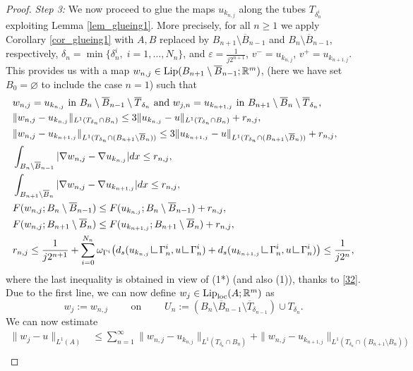\documentclass[a4paper,11pt]{article}
\numberwithin{equation}{section}
\newcommand{\R}{\mathbb{R}}
\newcommand{\res}      {\mathop{\hbox{\vrule height 7pt width .5pt depth
                        0pt\vrule height .5pt width 6pt depth 0pt}}\nolimits}
\begin{document}
\begin{proof}
\textit{Step 3:} We now proceed to glue the maps $u_{k_{n,j}}$ along the tubes $T_{\delta_n^i}$ exploiting Lemma \ref{lem_glueing1}.
More precisely, for all $n\geq1$ we apply Corollary \ref{cor_glueing1} with $A,B$ replaced by $B_{n+1}\setminus \overline B_{n-1}$ and $B_{n}\setminus\overline  B_{n-1} $, respectively, $\delta_n=\min\{\delta_n^i,\;{i=1,\dots,N_n}\}$, and $\varepsilon=\frac{1}{j2^{n+1}}$, $v^-=u_{k_{n,j}}$, $v^+=u_{k_{n+1,j}}$. This provides us with a map $w_{n,j}\in \text{{\rm Lip}}(B_{n+1}\setminus \overline B_{n-1};\R^m)$, (here we have set $B_0=\varnothing$ to include the case $n=1$) such that 
	\begin{align}
	&w_{n,j}=u_{k_{n,j}}\text{ in }B_{n}\setminus\overline  B_{n-1} \setminus \overline T_{\delta_n}\text{ and }w_{j,n}=u_{k_{n+1,j}}\text{ in }B_{n+1}\setminus\overline  B_{n} \setminus  \overline T_{\delta_n},\nonumber\\
	&\|w_{n,j}-u_{k_{n,j}}\|_{L^1(T_{\delta_n}\cap B_n)}\leq 3\|u_{k_{n,j}}-u\|_{L^1(T_{\delta_n}\cap B_n)}+r_{n,j},\nonumber\\
	&\|w_{n,j}-u_{k_{n+1,j}}\|_{L^1(T_{\delta_n}\cap (B_{n+1}\setminus\overline B_n))}\leq 3\|u_{k_{n+1,j}}-u\|_{L^1(T_{\delta_n}\cap (B_{n+1}\setminus\overline B_n))}+r_{n,j},\nonumber\\
	&\int_{B_{n}\setminus\overline  B_{n-1}}|\nabla w_{n,j}-\nabla u_{k_{n,j}}|dx\leq r_{n,j},\label{glueingthesis2}\\
	&\int_{B_{n+1}\setminus\overline  B_{n}}|\nabla w_{n,j}-\nabla u_{k_{n+1,j}}|dx\leq r_{n,j},\nonumber\\
	&F(w_{n,j};B_{n}\setminus\overline  B_{n-1})\leq F(u_{k_{n,j}}; B_{n}\setminus\overline  B_{n-1})+r_{n,j},\nonumber\\
	&F(w_{n,j};B_{n+1}\setminus\overline  B_{n})\leq F(u_{k_{n+1,j}};B_{n+1}\setminus\overline  B_{n})+r_{n,j},\nonumber\\
	&r_{n,j}\leq \frac{1}{j2^{n+1}}+\sum_{i=0}^{N_n}\omega_{\Gamma^i}\big(d_s(u_{k_{n,j}}\res \Gamma_n^i,u\res \Gamma_n^i)+d_s(u_{k_{n+1,j}}\res \Gamma_n^i,u\res \Gamma_n^i)\big)\leq  \frac{1}{j2^{n}},\nonumber
\end{align}
where the last inequality is obtained in view of (1*) (and also (1)), thanks to \eqref{32}. Due to the first line, we can now define $w_j\in \text{{\rm Lip}}_{\text{loc}}(A;\R^m)$ as
$$w_j:=w_{n,j}\qquad\text{ on }\qquad U_n:=(B_{n}\setminus\overline  B_{n-1}\setminus \overline T_{\delta_{n-1}})\cup T_{\delta_n}.$$
We can now estimate 
\begin{align*}
\|w_j-u\|_{L^1(A)}&\leq \sum_{n=1}^\infty \|w_{n,j}-u_{k_{n,j}}\|_{L^1(T_{\delta_n}\cap B_n)}+\|w_{n,j}-u_{k_{n+1,j}}\|_{L^1(T_{\delta_n}\cap (B_{n+1}\setminus\overline B_n))}\nonumber\\

\end{align*}
\end{proof}
\end{document}

